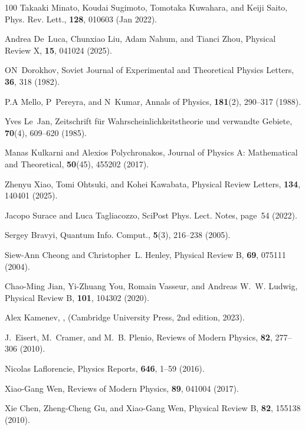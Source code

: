 \documentclass[preprint,pteplogo]{ptephy_v2}%
\numberwithin{equation}{section}
\theoremstyle{definition}
\begin{document}
\begin{thebibliography}{100}
Takaaki Minato, Koudai Sugimoto, Tomotaka Kuwahara, and Keiji Saito, Phys. Rev. Lett., {\bf 128}, 010603 (Jan 2022).

Andrea De~Luca, Chunxiao Liu, Adam Nahum, and Tianci Zhou, Physical Review X, {\bf 15}, 041024 (2025).

ON~Dorokhov, Soviet Journal of Experimental and Theoretical Physics Letters, {\bf 36}, 318 (1982).

P.A Mello, P~Pereyra, and N~Kumar, Annals of Physics, {\bf 181}(2), 290--317 (1988).

Yves Le~Jan, Zeitschrift f{\"u}r Wahrscheinlichkeitstheorie und verwandte Gebiete, {\bf 70}(4), 609--620 (1985).

Manas Kulkarni and Alexios Polychronakos, Journal of Physics A: Mathematical and Theoretical, {\bf 50}(45), 455202 (2017).

Zhenyu Xiao, Tomi Ohtsuki, and Kohei Kawabata, Physical Review Letters, {\bf 134}, 140401 (2025).

Jacopo Surace and Luca Tagliacozzo, SciPost Phys. Lect. Notes, page~54 (2022).

Sergey Bravyi, Quantum Info. Comput., {\bf 5}(3), 216–238 (2005).

Siew-Ann Cheong and Christopher~L. Henley, Physical Review B, {\bf 69}, 075111 (2004).

Chao-Ming Jian, Yi-Zhuang You, Romain Vasseur, and Andreas W.~W. Ludwig, Physical Review B, {\bf 101}, 104302 (2020).

Alex Kamenev,
,
\newblock  (Cambridge University Press, 2nd edition, 2023).

J.~Eisert, M.~Cramer, and M.~B. Plenio, Reviews of Modern Physics, {\bf 82}, 277--306 (2010).

Nicolas Laflorencie, Physics Reports, {\bf 646}, 1--59 (2016).

Xiao-Gang Wen, Reviews of Modern Physics, {\bf 89}, 041004 (2017).

Xie Chen, Zheng-Cheng Gu, and Xiao-Gang Wen, Physical Review B, {\bf 82}, 155138 (2010).


\end{thebibliography}
\end{document}
